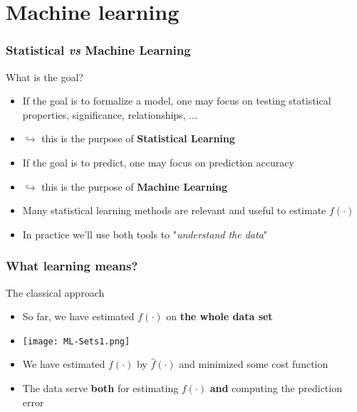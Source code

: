 \documentclass[xcolor=x11names,compress, aspectratio=169]{beamer}
\renewcommand{\(}{\begin{columns}}
\renewcommand{\)}{\end{columns}}
\newcommand{\<}[1]{\begin{column}{#1}}
\renewcommand{\>}{\end{column}}
\begin{document}

\section{Machine learning}


\begin{frame}
\frametitle{\textcolor{brique}{Statistical \textit{vs} Machine Learning}}
What is the goal?
\pause
\begin{itemize}[<+->]
\item If the goal is to formalize a model, one may focus on testing statistical properties, significance, relationships, ...
\item[] $\hookrightarrow $ this is the purpose of \textbf{Statistical Learning }
\item If the goal is to predict, one may focus on prediction accuracy
\item[] $\hookrightarrow $ this is the purpose of \textbf{Machine Learning }
\item Many statistical learning methods are relevant and useful to estimate $f(\cdot)$
\item In practice we'll use both tools to  "\emph{understand the data}"

\end{itemize}
\end{frame}


\begin{frame}
\frametitle{\textcolor{brique}{ What learning means?}}
The classical approach
\begin{itemize}[<+->]
\item So far, we have estimated $f(\cdot)$ on \textbf{the whole data set}
\item[] \texttt{[image: ML-Sets1.png]}
\item We have estimated $f(\cdot)$ by $\widehat f(\cdot)$  and minimized some cost function
\item The data serve \textbf{both} for estimating $f(\cdot)$ \textbf{and} computing the prediction error
\end{itemize}
\end{frame}
\end{document}
